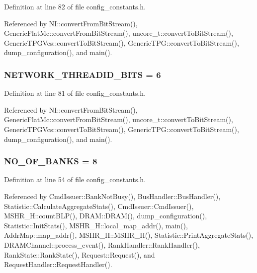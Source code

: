 Definition at line 82 of file config\_\-constants.h.

Referenced by NI::convertFromBitStream(), GenericFlatMc::convertFromBitStream(), uncore\_\-t::convertToBitStream(), GenericTPGVcs::convertToBitStream(), GenericTPG::convertToBitStream(), dump\_\-configuration(), and main().
\subsubsection[{NETWORK\_\-THREADID\_\-BITS}]{ {\bf NETWORK\_\-THREADID\_\-BITS} = 6}\label{config__constants_8h_582a80c814dfe22c0a7ad5dda77d2033}




Definition at line 81 of file config\_\-constants.h.

Referenced by NI::convertFromBitStream(), GenericFlatMc::convertFromBitStream(), uncore\_\-t::convertToBitStream(), GenericTPGVcs::convertToBitStream(), GenericTPG::convertToBitStream(), dump\_\-configuration(), and main().
\subsubsection[{NO\_\-OF\_\-BANKS}]{ {\bf NO\_\-OF\_\-BANKS} = 8}\label{config__constants_8h_a9a8bc812122b9b1129824fdea80e872}




Definition at line 54 of file config\_\-constants.h.

Referenced by CmdIssuer::BankNotBusy(), BusHandler::BusHandler(), Statistic::CalculateAggregateStats(), CmdIssuer::CmdIssuer(), MSHR\_\-H::countBLP(), DRAM::DRAM(), dump\_\-configuration(), Statistic::InitStats(), MSHR\_\-H::local\_\-map\_\-addr(), main(), AddrMap::map\_\-addr(), MSHR\_\-H::MSHR\_\-H(), Statistic::PrintAggregateStats(), DRAMChannel::process\_\-event(), RankHandler::RankHandler(), RankState::RankState(), Request::Request(), and RequestHandler::RequestHandler().
